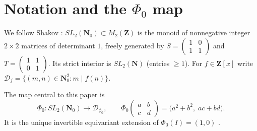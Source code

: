 \documentclass[11pt]{article}
\theoremstyle{definition}
\newcommand{\N}{\mathbf{N}}
\newcommand{\Nz}{\mathbf{N}_0}
\newcommand{\Z}{\mathbf{Z}}
\newcommand{\Q}{\mathbf{Q}}
\newcommand{\Df}{\mathcal{D}_f}
\newcommand{\SLNz}{SL_2(\Nz)}
\newcommand{\SLN}{SL_2(\N)}
\newcommand{\spin}{\mathrm{spin}}
\begin{document}
\begin{abstract}
\begin{enumerate}
its Galois group is $(\Z/2)^4$ over $\Q$ and the $16$ irreducible characters give a
combinatorial decomposition of any joint generating series. We point out one
genuinely new heuristic consequence (Heuristic~\ref{heu:joint-density}) on the joint
density of indices $n$ for which all four of $\phi_0(n),\phi_1(n),\psi_2(n),\phi_3(n)$ are
prime;
\item translate Friedlander--Iwaniec spin
$\spin(\alpha) = \left(\frac{\bar\alpha}{\alpha}\right)$ on Gaussian primes
(\cite{FI98a,FI98b}) into a $\pm 1$-valued statistic on $\SLNz$-words and explain precisely
why the obvious one-variable analogue for $n^2+1$ collapses, but why the
\emph{four-variable} matrix-side reformulation supplies the second variable that the
classical one-variable problem lacks (Section~\ref{sec:spin}).
\end{enumerate}
None of (1)--(5) constitutes a proof of Landau's fourth problem. Section~\ref{sec:status}
records honestly which statements are theorems, which are conjectures, which are heuristics,
and where the gaps lie. The principal contribution of this note is the explicit dictionary
between Shakov's elementary $\SLNz$-language and the Hecke / class-field-theoretic
machinery of $\Q(i)$; we believe this dictionary clarifies what \emph{would} be needed to
go beyond Iwaniec's $P_2$.
\end{abstract}

\tableofcontents

\section{Notation and the $\Phi_0$ map}\label{sec:setup}

We follow Shakov \cite{shakov}: $\SLNz \subset M_2(\Z)$ is the monoid of nonnegative
integer $2\times 2$ matrices of determinant $1$, freely generated by
$S = \left(\begin{smallmatrix} 1 & 0 \\ 1 & 1 \end{smallmatrix}\right)$ and
$T = \left(\begin{smallmatrix} 1 & 1 \\ 0 & 1 \end{smallmatrix}\right)$. Its strict
interior is $\SLN$ (entries $\ge 1$). For $f \in \Z[x]$ write
$\Df = \{(m,n) \in \Nz^2 : m \mid f(n)\}$.

The map central to this paper is
\[
  \Phi_0 \colon \SLNz \to \mathcal{D}_{\phi_0},
  \qquad
  \Phi_0\!\begin{pmatrix} a & b \\ c & d \end{pmatrix}
   = \bigl(a^2+b^2,\; ac+bd\bigr).
\]
It is the unique invertible equivariant extension of $\Phi_0(I) = (1,0)$
\cite[Theorem 2.5]{shakov}.
\end{document}
